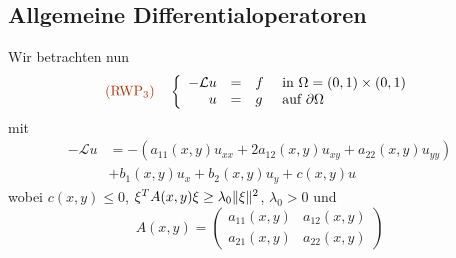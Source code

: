 \documentclass{cheat-sheet}
\newcommand{\bOmega}{\partial \Omega} %
\newcommand{\LL}{\mathcal{L}} %
\newcommand{\tss}[1]{\textsubscript{#1}} %
\newcommand{\probl}[1]{\textcolor{ProblemColor}{#1}}
\begin{document}
\subsection{Allgemeine Differentialoperatoren}

\begin{prob}
  Wir betrachten nun
  \[
    \text{\probl{(RWP\tss{3})}} \quad
    \left\{ \begin{array}{rlll}
      - \LL u &=& f &\text{ in $\Omega = \ointerval{0}{1} \times \ointerval{0}{1}$} \\
      u &=& g &\text{ auf $\bOmega$}
    \end{array} \right.
   \]
  mit
  \begin{align*}
    - \LL u&  = - (a_{11}(x, y) u_{xx} + 2 a_{12}(x, y) u_{xy} + a_{22}(x, y) u_{yy}) \\
    & + b_1(x, y) u_x + b_2(x, y) u_y + c(x, y) u
  \end{align*}
  wobei $c(x, y) \leq 0$, $\xi^T A(x, y) \xi \geq \lambda_0 \lVert\xi\rVert^2$, $\lambda_0 > 0$ und
  \[
    A(x, y) = \begin{pmatrix}
      a_{11}(x,y) & a_{12}(x,y) \\
      a_{21}(x,y) & a_{22}(x,y)
    \end{pmatrix}
  \]
\end{prob}
\end{document}
